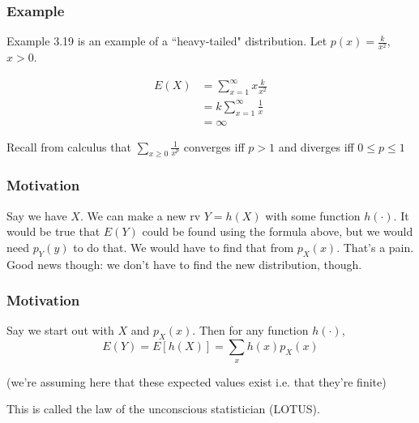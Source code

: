 \documentclass{beamer}
\begin{document}

\begin{frame}
\frametitle{Example}

Example 3.19 is an example of a ``heavy-tailed" distribution. Let $p(x) = \frac{k}{x^2}$, $x > 0$. 

\begin{align*}
E(X) &= \sum_{x=1}^{\infty}x \frac{k}{x^2} \\
&= k \sum_{x=1}^{\infty}\frac{1}{x} \\
&= \infty
\end{align*}

Recall from calculus that $\sum_{x\ge 0} \frac{1}{x^p}$ converges iff $p > 1$ and diverges iff $0 \le p \le 1$

\end{frame}


\begin{frame}
\frametitle{Motivation}

Say we have $X$. We can make a new rv $Y = h(X)$ with some function $h(\cdot)$. It would be true that $E(Y)$ could be found using the formula above, but we would need $p_Y(y)$ to do that. We would have to find that from $p_X(x)$. That's a pain. Good news though: we don't have to find the new distribution, though.

\end{frame}


\begin{frame}
\frametitle{Motivation}

Say we start out with $X$ and $p_X(x)$. Then for any function $h(\cdot)$, 
\[
E(Y) = E[h(X)] = \sum_{x}h(x)p_X(x)
\]

(we're assuming here that these expected values exist i.e. that they're finite)
\newline

This is called the law of the unconscious statistician (LOTUS).

\end{frame}
\end{document}
